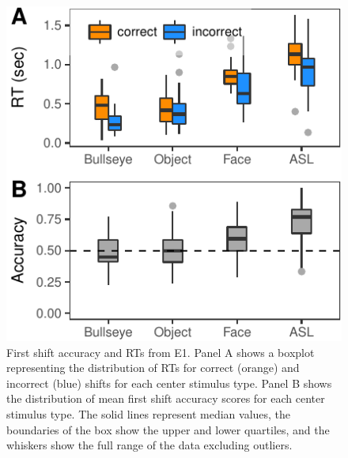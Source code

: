 \documentclass[10pt, letterpaper]{article}
\newenvironment{CodeChunk}{}{}
\begin{document}
\begin{CodeChunk}
\begin{figure}[t]

{\centering \includegraphics{figs/e1_acc_rt_plot-1} 

}

\caption[First shift accuracy and RTs from E1]{First shift accuracy and RTs from E1. Panel A shows a boxplot representing the distribution of RTs for correct (orange) and incorrect (blue) shifts for each center stimulus type. Panel B shows the distribution of mean first shift accuracy scores for each center stimulus type. The solid lines represent median values, the boundaries of the box show the upper and lower quartiles, and the whiskers show the full range of the data excluding outliers.}\label{fig:e1_acc_rt_plot}
\end{figure}
\end{CodeChunk}
\end{document}
